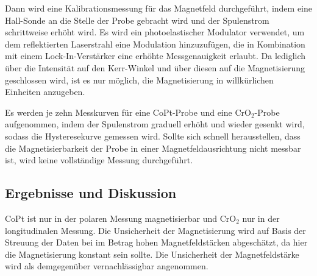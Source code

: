   Dann wird eine Kalibrationsmessung für das Magnetfeld durchgeführt, indem eine Hall-Sonde an die Stelle der Probe gebracht wird und der Spulenstrom schrittweise erhöht wird.
  Es wird ein photoelastischer Modulator verwendet, um dem reflektierten Laserstrahl eine Modulation hinzuzufügen, die in Kombination mit einem Lock-In-Verstärker eine erhöhte Messgenauigkeit erlaubt.
  Da lediglich über die Intensität auf den Kerr-Winkel und über diesen auf die Magnetisierung geschlossen wird, ist es nur möglich, die Magnetisierung in willkürlichen Einheiten anzugeben.

  Es werden je zehn Messkurven für eine CoPt-Probe und eine CrO$_2$-Probe aufgenommen, indem der Spulenstrom graduell erhöht und wieder gesenkt wird, sodass die Hysteresekurve gemessen wird.
  Sollte sich schnell herausstellen, dass die Magnetisierbarkeit der Probe in einer Magnetfeldausrichtung nicht messbar ist, wird keine vollständige Messung durchgeführt. %


\subsection{Ergebnisse und Diskussion}

CoPt ist nur in der polaren Messung magnetisierbar und CrO$_2$ nur in der longitudinalen Messung.
Die Unsicherheit der Magnetisierung wird auf Basis der Streuung der Daten bei im Betrag hohen Magnetfeldstärken abgeschätzt, da hier die Magnetisierung konstant sein sollte.
Die Unsicherheit der Magnetfeldstärke wird als demgegenüber vernachlässigbar angenommen.

